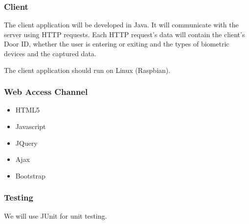 \subsubsection{Client}
The client application will be developed in Java. It will communicate with the server using HTTP requests. Each HTTP request's data will contain the client's Door ID, whether the user is entering or exiting and the types of biometric devices and the captured data. 

The client application should run on Linux (Raspbian).

\subsubsection{Web Access Channel}
\begin{itemize}
	\item HTML5
	\item Javascript
	\item JQuery
	\item Ajax
	\item Bootstrap
\end{itemize}

\subsubsection{Testing}
We will use JUnit for unit testing.